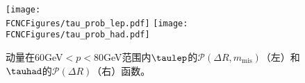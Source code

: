 
\begin{figure}[H]
\centering
\texttt{[image: \\FCNCFigures/tau\_prob\_lep.pdf]}
\texttt{[image: \\FCNCFigures/tau\_prob\_had.pdf]}
\caption{动量在60GeV$<p<80$GeV范围内$\taulep$的$\mathcal{P}(\Delta R,m_{\mathrm{mis}})$（左）和$\tauhad$的$\mathcal{P}(\Delta R)$（右）函数。}
\label{fig:tau_prob}
\end{figure}